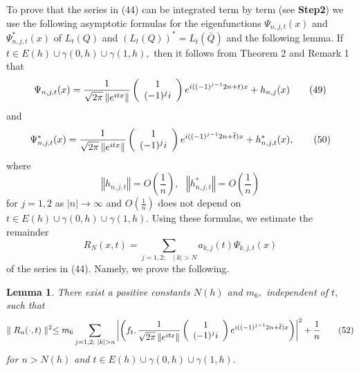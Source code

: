 \documentclass{article}%
\newtheorem{lemma}{Lemma}
{}
\begin{document}
To prove that the series in (44) can be integrated term by term (see
\textbf{Step2}) we use the following asymptotic formulas for the
eigenfunctions $\Psi_{n,j,t}(x)$ and $\Psi_{n,j,t}^{\ast}(x)$ of $L_{t}(Q)$
and $\left(  L_{t}(Q)\right)  ^{\ast}=L_{\overline{t}}(\overline{Q})$ and the
following lemma. If $t\in E(h)\cup\gamma(0,h)\cup\gamma(1,h),$ then it follows
from Theorem 2 and Remark 1 that
\begin{equation}
\Psi_{n,j,t}(x)=\frac{1}{\sqrt{2\pi}\left\Vert e^{itx}\right\Vert }\left(
\begin{array}
[c]{c}%
1\\
(-1)^{j}i
\end{array}
\right)  e^{i((-1)^{j-1}2n+t)x}+h_{n,j}(x) \tag{49}%
\end{equation}
and
\begin{equation}
\Psi_{n,j,t}^{\ast}(x)=\frac{1}{\sqrt{2\pi}\left\Vert e^{itx}\right\Vert
}\left(
\begin{array}
[c]{c}%
1\\
(-1)^{j}i
\end{array}
\right)  e^{i((-1)^{j-1}2n+\overline{t})x}+h_{n,j,t}^{\ast}(x), \tag{50}%
\end{equation}
where
\begin{equation}
\left\Vert h_{n,j,t}\right\Vert =O(\frac{1}{n}),\text{ }\left\Vert
h_{n,j,t}^{\ast}\right\Vert =O(\frac{1}{n}) \tag{51}%
\end{equation}
for $j=1,2$ as $\left\vert n\right\vert \rightarrow\infty$ and $O(\frac{1}%
{n})$ does not depend on $t\in E(h)\cup\gamma(0,h)\cup\gamma(1,h).$ Using
these formulas, we estimate the remainder
\[
R_{N}(x,t)=\sum_{j=1,2;\text{ }\mid k\mid>N}a_{k,j}(t)\Psi_{k,j,t}(x)
\]
of the series in (44). Namely, we prove the following.

\begin{lemma}
There exist a positive constants $N(h)$ and $m_{6},$ independent of $t,$ such
that
\begin{equation}
\parallel R_{n}(\cdot,t)\parallel^{2}\leq m_{6}\sum_{j=1,2;\text{ }\mid
k\mid>n}\left\vert \left(  f_{t},\frac{1}{\sqrt{2\pi}\left\Vert e^{itx}%
\right\Vert }\left(
\begin{array}
[c]{c}%
1\\
(-1)^{j}i
\end{array}
\right)  e^{i((-1)^{j-1}2n+\overline{t})x}\right)  \right\vert ^{2}+\frac
{1}{n} \tag{52}%
\end{equation}
for $n>N(h)$ and $t\in E(h)\cup\gamma(0,h)\cup\gamma(1,h).$
\end{lemma}
\end{document}
